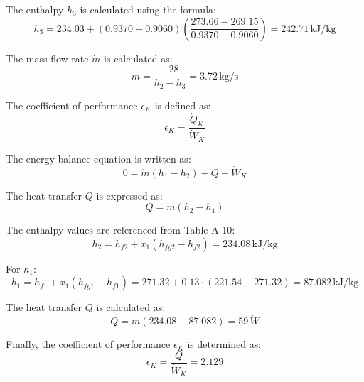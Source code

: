 The enthalpy \( h_3 \) is calculated using the formula:  
\[
h_3 = 234.03 + (0.9370 - 0.9060) \left( \frac{273.66 - 269.15}{0.9370 - 0.9060} \right) = 242.71 \, \text{kJ/kg}
\]  

The mass flow rate \( \dot{m} \) is calculated as:  
\[
\dot{m} = \frac{-28}{h_2 - h_3} = 3.72 \, \text{kg/s}
\]

The coefficient of performance \( \epsilon_K \) is defined as:  
\[
\epsilon_K = \frac{\dot{Q}_K}{\dot{W}_K}
\]

The energy balance equation is written as:  
\[
0 = \dot{m} (h_1 - h_2) + Q - \dot{W}_K
\]

The heat transfer \( Q \) is expressed as:  
\[
Q = \dot{m} (h_2 - h_1)
\]

The enthalpy values are referenced from Table A-10:  
\[
h_2 = h_{f2} + x_1 (h_{fg2} - h_{f2}) = 234.08 \, \text{kJ/kg}
\]

For \( h_1 \):  
\[
h_1 = h_{f1} + x_1 (h_{fg1} - h_{f1}) = 271.32 + 0.13 \cdot (221.54 - 271.32) = 87.082 \, \text{kJ/kg}
\]

The heat transfer \( Q \) is calculated as:  
\[
Q = \dot{m} (234.08 - 87.082) = 59 \, \dot{W}
\]

Finally, the coefficient of performance \( \epsilon_K \) is determined as:  
\[
\epsilon_K = \frac{Q}{\dot{W}_K} = 2.129
\]